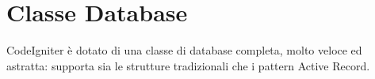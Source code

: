 \section{Classe Database}
\label{class:database}

CodeIgniter è dotato di una classe di database completa, molto veloce ed astratta: supporta sia le strutture tradizionali che i pattern Active Record.